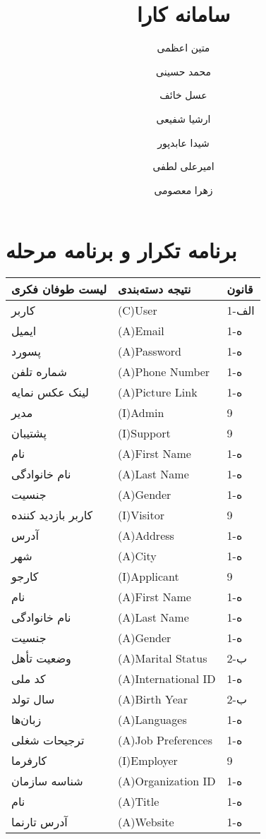 \documentclass[12pt]{article}
\author{متین اعظمی}
\author{محمد حسینی}
\author{عسل خائف}
\author{ارشیا شفیعی}
\author{شیدا عابدپور}
\author{امیرعلی لطفی}
\author{زهرا معصومی}
\title{سامانه کارا}
\begin{document}
	
	\section{برنامه تکرار و برنامه مرحله}
	
	\begin{longtable}{|l|l|l|}
		\hline
		لیست طوفان فکری & نتیجه دسته‌بندی & قانون \\
		\hline
		کاربر & (C)User & 1-الف \\
		\hline
		ایمیل & (A)Email & 1-ه  \\
		\hline
		پسورد & (A)Password & 1-ه   \\
		\hline
		شماره تلفن & (A)Phone Number & 1-ه   \\
		\hline
		لینک عکس نمایه & (A)Picture Link & 1-ه   \\
		\hline
		مدیر & (I)Admin & 9     \\
		\hline
		پشتیبان & (I)Support & 9     \\
		\hline
		نام & (A)First Name & 1-ه   \\
		\hline
		نام خانوادگی & (A)Last Name & 1-ه   \\
		\hline
		جنسیت & (A)Gender & 1-ه   \\
		\hline
		کاربر بازدید کننده & (I)Visitor & 9     \\
		\hline
		آدرس & (A)Address & 1-ه   \\
		\hline
		شهر & (A)City & 1-ه   \\
		\hline
		کارجو & (I)Applicant & 9     \\
		\hline
		نام & (A)First Name & 1-ه   \\
		\hline
		نام خانوادگی & (A)Last Name & 1-ه   \\
		\hline
		جنسیت & (A)Gender & 1-ه   \\
		\hline
		وضعیت تأهل & (A)Marital Status & 2-ب   \\
		\hline
		کد ملی & (A)International ID & 1-ه   \\
		\hline
		سال تولد & (A)Birth Year & 2-ب   \\
		\hline
		زبان‌ها & (A)Languages & 1-ه   \\
		\hline
		ترجیحات شغلی & (A)Job Preferences & 1-ه   \\
		\hline
		کارفرما & (I)Employer & 9     \\
		\hline
		شناسه سازمان & (A)Organization ID & 1-ه   \\
		\hline
		نام & (A)Title & 1-ه   \\
		\hline
		آدرس تارنما & (A)Website & 1-ه   \\

\end{longtable}
\end{document}
